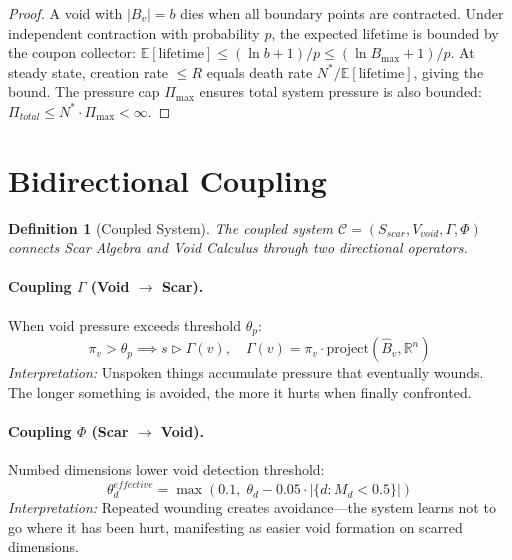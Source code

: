 \documentclass[11pt]{article}
\newtheorem{definition}[theorem]{Definition}
\begin{document}
\begin{proof}
A void with $|B_v| = b$ dies when all boundary points are contracted. Under independent contraction with probability $p$, the expected lifetime is bounded by the coupon collector: $\mathbb{E}[\text{lifetime}] \leq (\ln b + 1)/p \leq (\ln B_{\max} + 1)/p$. At steady state, creation rate $\leq R$ equals death rate $N^*/\mathbb{E}[\text{lifetime}]$, giving the bound. The pressure cap $\Pi_{\max}$ ensures total system pressure is also bounded: $\Pi_{total} \leq N^* \cdot \Pi_{\max} < \infty$.
\end{proof}

\section{Bidirectional Coupling}
\label{sec:coupling}

\begin{definition}[Coupled System]
The coupled system $\mathcal{C} = (S_{scar}, V_{void}, \Gamma, \Phi)$ connects Scar Algebra and Void Calculus through two directional operators.
\end{definition}

\paragraph{Coupling $\Gamma$ (Void $\to$ Scar).}
When void pressure exceeds threshold $\theta_p$:
\begin{equation}
\pi_v > \theta_p \implies s \triangleright \Gamma(v), \quad \Gamma(v) = \pi_v \cdot \text{project}(\hat{B}_v, \mathbb{R}^n)
\end{equation}
\emph{Interpretation:} Unspoken things accumulate pressure that eventually wounds. The longer something is avoided, the more it hurts when finally confronted.

\paragraph{Coupling $\Phi$ (Scar $\to$ Void).}
Numbed dimensions lower void detection threshold:
\begin{equation}
\theta_d^{effective} = \max\!\left(0.1,\; \theta_d - 0.05 \cdot |\{d : M_d < 0.5\}|\right)
\end{equation}
\emph{Interpretation:} Repeated wounding creates avoidance---the system learns not to go where it has been hurt, manifesting as easier void formation on scarred dimensions.
\end{document}
